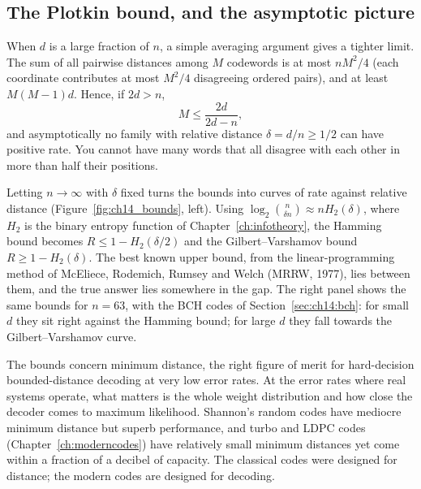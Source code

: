 \subsection{The Plotkin bound, and the asymptotic picture}

When $d$ is a large fraction of $n$, a simple averaging argument gives a tighter limit. The sum of
all pairwise distances among $M$ codewords is at most $nM^2/4$ (each coordinate contributes at
most $M^2/4$ disagreeing ordered pairs), and at least $M(M-1)d$. Hence, if $2d>n$,
\begin{equation}
M\le\frac{2d}{2d-n},
\label{eq:ch14:plotkin}
\end{equation}
and asymptotically no family with relative distance $\delta=d/n\ge1/2$ can have positive rate. You
cannot have many words that all disagree with each other in more than half their positions.

Letting $n\to\infty$ with $\delta$ fixed turns the bounds into curves of rate against relative
distance (Figure~\ref{fig:ch14_bounds}, left). Using $\log_2\binom{n}{\delta n}\approx
nH_2(\delta)$, where $H_2$ is the binary entropy function of Chapter~\ref{ch:infotheory}, the
Hamming bound becomes $R\le1-H_2(\delta/2)$ and the Gilbert--Varshamov bound $R\ge1-H_2(\delta)$.
The best known upper bound, from the linear-programming method of McEliece, Rodemich, Rumsey and
Welch (MRRW, 1977), lies between them, and the true answer lies somewhere in the gap. The right
panel shows the same bounds for $n=63$, with the BCH codes of Section~\ref{sec:ch14:bch}: for small
$d$ they sit right against the Hamming bound; for large $d$ they fall towards the
Gilbert--Varshamov curve.


\begin{keyidea}
The bounds concern minimum distance, the right figure of merit for hard-decision
bounded-distance decoding at very low error rates. At the error rates where real systems operate,
what matters is the whole weight distribution and how close the decoder comes to maximum
likelihood. Shannon's random codes have mediocre minimum distance but superb performance, and
turbo and LDPC codes (Chapter~\ref{ch:moderncodes}) have relatively small minimum distances yet
come within a fraction of a decibel of capacity. The classical codes were designed for distance;
the modern codes are designed for decoding.
\end{keyidea}


